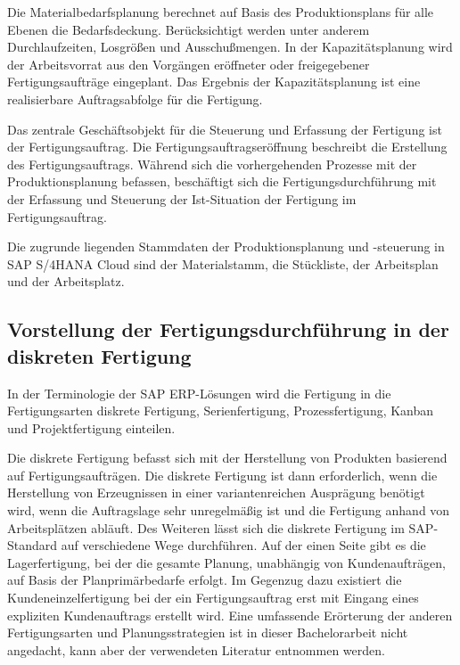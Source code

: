 Die Materialbedarfsplanung berechnet auf Basis des Produktionsplans für alle Ebenen die Bedarfsdeckung. Berücksichtigt werden unter anderem Durchlaufzeiten, Losgrößen und Ausschußmengen.
In der Kapazitätsplanung wird der Arbeitsvorrat aus den Vorgängen eröffneter oder freigegebener Fertigungsaufträge eingeplant. Das Ergebnis der Kapazitätsplanung ist eine realisierbare Auftragsabfolge für die Fertigung.
\cite{Dickersbach.2014} 

Das zentrale Geschäftsobjekt für die Steuerung und Erfassung der Fertigung ist der Fertigungsauftrag. Die Fertigungsauftragseröffnung beschreibt die Erstellung des Fertigungsauftrags. 
Während sich die vorhergehenden Prozesse mit der Produktionsplanung befassen, beschäftigt sich die Fertigungsdurchführung mit der Erfassung und Steuerung der Ist-Situation der Fertigung im Fertigungsauftrag.
\cite{Dickersbach.2014} 

Die zugrunde liegenden Stammdaten der Produktionsplanung und -steuerung in SAP S/4HANA Cloud sind der Materialstamm, die Stückliste, der Arbeitsplan und der Arbeitsplatz. 
\cite{Dickersbach.2014}

\subsection{Vorstellung der Fertigungsdurchführung in der diskreten Fertigung}
In der Terminologie der SAP \ac{ERP}-Lösungen wird die Fertigung in die Fertigungsarten diskrete Fertigung, Serienfertigung, Prozessfertigung, Kanban und Projektfertigung einteilen. 

Die diskrete Fertigung befasst sich mit der Herstellung von Produkten basierend auf Fertigungsaufträgen. 
Die diskrete Fertigung ist dann erforderlich, wenn die Herstellung von Erzeugnissen in einer variantenreichen Ausprägung benötigt wird, wenn die Auftragslage sehr unregelmäßig ist und die Fertigung anhand von Arbeitsplätzen abläuft. 
\cite{Mathieu.2014}
Des Weiteren lässt sich die diskrete Fertigung im SAP-Standard auf verschiedene Wege durchführen. Auf der einen Seite gibt es die Lagerfertigung, bei der die gesamte Planung, unabhängig von Kundenaufträgen, auf Basis der Planprimärbedarfe erfolgt. Im Gegenzug dazu existiert die Kundeneinzelfertigung bei der ein Fertigungsauftrag erst mit Eingang eines expliziten Kundenauftrags erstellt wird. Eine umfassende Erörterung der anderen Fertigungsarten und Planungsstrategien ist in dieser Bachelorarbeit nicht angedacht, kann aber der verwendeten Literatur entnommen werden.
\cite{Dickersbach.2014}

